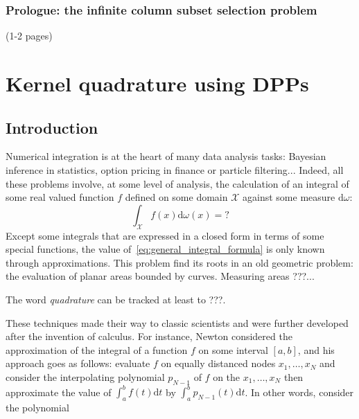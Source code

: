 \documentclass[twoside,11pt]{book}
\begin{document}
\subsection{Prologue: the infinite column subset selection problem} (1-2 pages)

\clearpage

\chapter{Kernel quadrature using DPPs}
\section{Introduction}
Numerical integration is at the heart of many data analysis tasks: Bayesian inference in statistics, option pricing in finance or  particle filtering... Indeed, all these problems involve, at some level of analysis, the calculation of an integral of some real valued function $f$ defined on some domain $\mathcal{X}$ against some measure $\mathrm{d}\omega$:
\begin{equation}\label{eq:general_integral_formula}
\int_{\mathcal{X}}f(x)\mathrm{d}\omega(x)  =  ?
\end{equation}
Except some integrals that are expressed in a closed form in terms of some special functions, the value of~\eqref{eq:general_integral_formula} is only known through approximations. This problem find its roots in an old geometric problem: the evaluation of planar areas bounded by curves. Measuring areas ???...


The word \emph{quadrature} can be tracked at least to ???.


 These techniques made their way to classic scientists and were further developed after the invention of calculus. For instance, Newton considered the approximation of the integral of a function $f$ on some interval $[a,b]$, and his approach goes as follows: evaluate $f$ on equally distanced nodes $x_{1}, \dots, x_{N}$ and consider the interpolating polynomial $p_{N-1}$ of $f$ on the $x_{1}, \dots, x_{N}$ then approximate the value of $\displaystyle \int_{a}^{b}f(t)\mathrm{d}t$ by $\displaystyle \int_{a}^{b}p_{N-1}(t)\mathrm{d}t$. In other words, consider the polynomial
\end{document}
